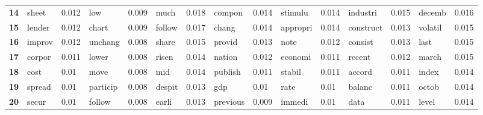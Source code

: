 \begin{tabular}{|l|l|l||l|l||l|l||l|l||l|l||l|l||l|l||}
\textbf{14} &  sheet &  0.012 &  low &  0.009 &  much &  0.018 &  compon &  0.014 &  stimulu &  0.014 &  industri &  0.015 &  decemb &  0.016 \\
\textbf{15} &  lender &  0.012 &  chart &  0.009 &  follow &  0.017 &  chang &  0.014 &  appropri &  0.014 &  construct &  0.013 &  volatil &  0.015 \\
\textbf{16} &  improv &  0.012 &  unchang &  0.008 &  share &  0.015 &  provid &  0.013 &  note &  0.012 &  consist &  0.013 &  last &  0.015 \\
\textbf{17} &  corpor &  0.011 &  lower &  0.008 &  risen &  0.014 &  nation &  0.012 &  economi &  0.011 &  recent &  0.012 &  march &  0.015 \\
\textbf{18} &  cost &  0.01 &  move &  0.008 &  mid &  0.014 &  publish &  0.011 &  stabil &  0.011 &  accord &  0.011 &  index &  0.014 \\
\textbf{19} &  spread &  0.01 &  particip &  0.008 &  despit &  0.013 &  gdp &  0.01 &  rate &  0.01 &  balanc &  0.011 &  octob &  0.014 \\
\textbf{20} &  secur &  0.01 &  follow &  0.008 &  earli &  0.013 &  previous &  0.009 &  immedi &  0.01 &  data &  0.011 &  level &  0.014 \\
\bottomrule
\end{tabular}
